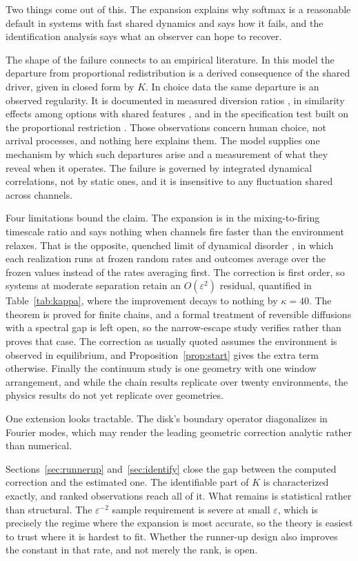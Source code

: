 \documentclass[11pt]{article}
\theoremstyle{remark}
\begin{document}
Two things come out of this. The expansion explains why softmax is a
reasonable default in systems with fast shared dynamics and says how it fails,
and the identification analysis says what an observer can hope to recover.

The shape of the failure connects to an empirical literature. In this model the
departure from proportional redistribution is a derived consequence of the
shared driver, given in closed form by $K$. In choice data the same departure
is an observed regularity. It is documented in measured diversion ratios
\citep{conlon2021}, in similarity effects among options with shared
features \citep{tversky1972}, and in the specification test built on the proportional
restriction \citep{hausman1984}. Those observations concern human choice, not
arrival processes, and nothing here explains them. The model supplies one
mechanism by which such departures arise and a measurement of what they reveal
when it operates. The failure
is governed by integrated dynamical correlations, not by static ones, and it is
insensitive to any fluctuation shared across channels.

Four limitations bound the claim. The expansion is in the mixing-to-firing
timescale ratio and says nothing when channels fire faster than the environment
relaxes. That is the opposite, quenched limit of dynamical disorder
\citep{zwanzig1990}, in which each realization runs at frozen random rates
and outcomes average over the frozen values instead of the rates averaging
first. The correction is first order, so systems at moderate separation
retain an $O(\varepsilon^2)$ residual, quantified in Table~\ref{tab:kappa},
where the improvement decays to nothing by $\kappa = 40$. The theorem is
proved for finite chains, and a formal treatment of reversible diffusions with
a spectral gap is left open, so the narrow-escape study verifies rather than
proves that case. The correction as usually quoted assumes the environment is observed in
equilibrium, and Proposition~\ref{prop:start} gives the extra term otherwise.
Finally the continuum study is one geometry with one window arrangement, and
while the chain results replicate over twenty environments, the physics results
do not yet replicate over geometries.

One extension looks tractable. The disk's boundary operator diagonalizes in
Fourier modes, which may render the leading geometric correction analytic
rather than numerical.

Sections~\ref{sec:runnerup} and~\ref{sec:identify} close the gap between the
computed correction and the estimated one. The identifiable part of $K$ is
characterized exactly, and ranked observations reach all of it. What remains is
statistical rather than structural. The $\varepsilon^{-2}$ sample requirement
is severe at small $\varepsilon$, which is precisely the regime where the
expansion is most accurate, so the theory is easiest to trust where it is
hardest to fit. Whether the runner-up design also improves the constant in that
rate, and not merely the rank, is open.
\end{document}
